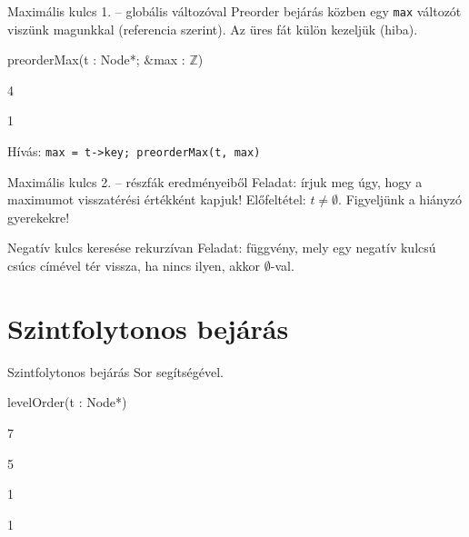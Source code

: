 \documentclass[hungarian]{beamer}
\begin{document}
\begin{frame}{Maximális kulcs 1. -- globális változóval}
Preorder bejárás közben egy \texttt{max} változót viszünk magunkkal (referencia szerint). Az üres fát külön kezeljük (hiba).

\vspace{2mm}
\setlength{\stukiwidth}{9cm}
\begin{stukibox*}{preorderMax(t : Node*; $\&$max : $\mathbb{Z}$)}
\begin{IF}[70]{4}{}
    \begin{IF}[50]{1}{}
    \ELSE
    \end{IF}
\ELSE
\end{IF}
\end{stukibox*}

\vspace{2mm}
Hívás: \texttt{max = t->key; preorderMax(t, max)}
\end{frame}

\begin{frame}[t]{Maximális kulcs 2. -- részfák eredményeiből}
Feladat: írjuk meg úgy, hogy a maximumot visszatérési értékként kapjuk! Előfeltétel: $t \neq \emptyset$. Figyeljünk a hiányzó gyerekekre!
\end{frame}

\begin{frame}[t]{Negatív kulcs keresése rekurzívan}
Feladat: függvény, mely egy negatív kulcsú csúcs címével tér vissza, ha nincs ilyen, akkor $\emptyset$-val.
\end{frame}

\section{Szintfolytonos bejárás}

\begin{frame}[t]{Szintfolytonos bejárás}
Sor segítségével.

\setlength{\stukiwidth}{9cm}
\begin{stukibox*}{levelOrder(t : Node*)}
\begin{IF}[85]{7}{}
    \begin{WHILE}{5}{}
        \begin{IF}[50]{1}{}
        \ELSE
        \end{IF}
        \begin{IF}[50]{1}{}
        \ELSE
        \end{IF}
    \end{WHILE}
\ELSE
\end{IF}
\end{stukibox*}
\end{frame}
\end{document}
